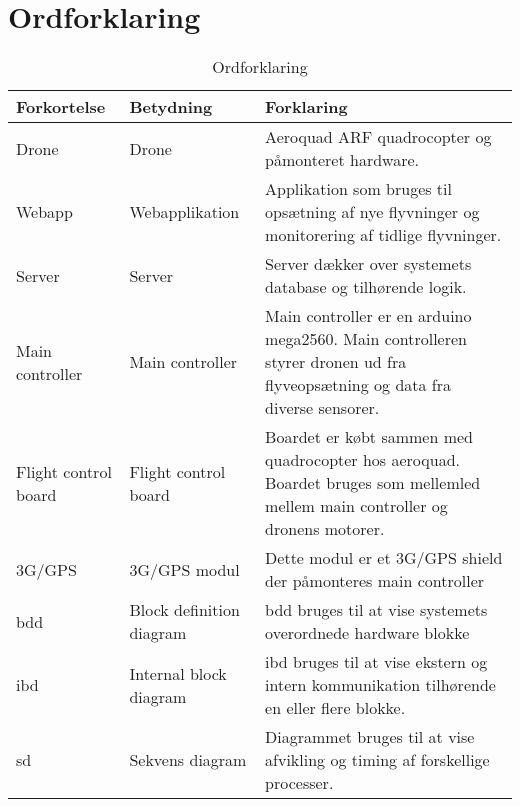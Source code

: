 \section{Ordforklaring}
\begin{table}[H]
	\centering
		\begin{tabular}{|p{2.6cm}|p{4.5 cm}|p{6.5 cm}|} 
		\hline
			\textbf{Forkortelse} & \textbf{Betydning} & \textbf{Forklaring} \\ \hline
			 Drone & Drone & Aeroquad ARF quadrocopter og \newline påmonteret hardware. \\ \hline
			 Webapp & Webapplikation & Applikation som bruges til opsætning af nye flyvninger og monitorering af tidlige flyvninger. \\ \hline
			 Server & Server & Server dækker over systemets database og tilhørende logik. \\ \hline
			 Main controller & Main controller  & Main controller er en arduino mega2560. Main controlleren styrer dronen ud fra flyveopsætning og data fra diverse sensorer.   \\ \hline
			 Flight control \newline board & Flight control board  & Boardet er købt sammen med quadrocopter hos aeroquad. Boardet bruges som mellemled mellem main controller og dronens motorer.  \\ \hline
			 3G/GPS & 3G/GPS modul  & Dette modul er et 3G/GPS shield der påmonteres main controller  \\ \hline
			 bdd& Block definition diagram  & bdd bruges til at vise systemets overordnede hardware blokke  \\ \hline
			 ibd& Internal block diagram & ibd bruges til at vise ekstern og intern kommunikation tilhørende en eller flere blokke. \\ \hline
			 sd& Sekvens diagram & Diagrammet bruges til at vise afvikling og timing af forskellige processer. \\ \hline			 
		\end{tabular}
	\caption{Ordforklaring}
\end{table}

\newpage
